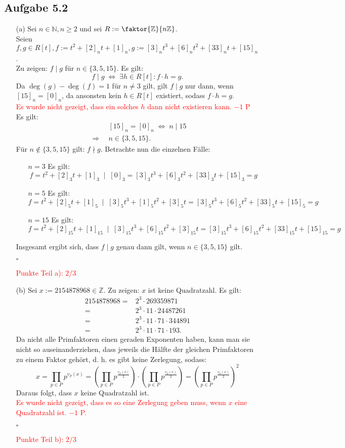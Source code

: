 \documentclass[12pt]{article}
\newcommand{\corr}[1]{\textcolor{red}{#1}}
\newcommand{\QED}{\begin{flushright} $\square$ \end{flushright}}
\newcommand{\df}{\enspace\Longrightarrow\enspace}
\newcommand{\gdw}{\;\Longleftrightarrow\;}
\begin{document}
\subsection*{Aufgabe 5.2}
\begin{enumerate}
	\item[(a)] Sei $n\in\mathbb{N},n\geq 2$ und sei $R:=\faktor{\mathbb{Z}}{n\mathbb{Z}}$. \\
	Seien $f,g\in R[t], f:=t^2+[2]_nt+[1]_n, g:=[3]_nt^3+[6]_nt^2+[33]_nt+[15]_n$. \\
	Zu zeigen: $f\mid g$ für $n\in\{3,5,15\}$. Es gilt:
	$$f\mid g \gdw \exists h\in R[t]:f\cdot h=g.$$
	Da $\deg(g)-\deg(f)=1$ für $n\neq 3$ gilt, gilt $f\mid g$ nur dann, wenn $[15]_n=[0]_n$, da ansonsten kein $h\in R[t]$ existiert, sodass $f\cdot h=g$.\\
\corr{Es wurde nicht gezeigt, dass ein solches $h$ dann nicht existieren kann. $-1$ P}\\
	 Es gilt:
	 \begin{align*}
	 	&[15]_n=[0]_n \gdw n\mid 15 \\
	 	\df &n\in\{3,5,15\}.
	 \end{align*}
	 Für $n\notin\{3,5,15\}$ gilt: $f\nmid g$.
	 Betrachte nun die einzelnen Fälle:
	 \begin{enumerate}
	 	\item[\underline{$n=3$}] Es gilt:
	 	$$f=t^2+[2]_3t+[1]_3 \;\mid\; [0]_3=[3]_3t^3+[6]_3t^2+[33]_3t+[15]_3=g$$
	 	
	 	\item[\underline{$n=5$}] Es gilt:
	 	$$f=t^2+[2]_5t+[1]_5 \;\mid\; [3]_5t^3+[1]_5t^2+[3]_5t=[3]_5t^3+[6]_5t^2+[33]_5t+[15]_5=g$$
	 	
	 	\item[\underline{$n=15$}] Es gilt:
	 	$$f=t^2+[2]_{15}t+[1]_{15} \;\mid\; [3]_{15}t^3+[6]_{15}t^2+[3]_{15}t=[3]_{15}t^3+[6]_{15}t^2+[33]_{15}t+[15]_{15}=g$$
	 \end{enumerate}
	 Insgesamt ergibt sich, dass $f\mid g$ genau dann gilt, wenn $n\in\{3,5,15\}$ gilt.
	 \QED
\corr{Punkte Teil a): $2/3$}
	
	\item[(b)] Sei $x:=2154878968\in\mathbb{Z}$. 
	Zu zeigen: $x$ ist keine Quadratzahl. Es gilt:
	\begin{align*}
		2154878968 =& 2^3\cdot 269359871 \\
		=& 2^3\cdot 11\cdot 24487261 \\
		=& 2^3\cdot 11\cdot 71\cdot 344891 \\
		=& 2^3\cdot 11\cdot 71\cdot 193.
	\end{align*}
	Da nicht alle Primfaktoren einen geraden Exponenten haben, kann man sie nicht so auseinanderziehen, dass jeweils die Hälfte der gleichen Primfaktoren zu einem Faktor gehört, d. h. es gibt keine Zerlegung, sodass:
	$$x=\prod_{p\in P}p^{\upsilon_p(x)}=\left(\prod_{p\in P}p^{\frac{\upsilon_p(x)}{2}}\right)\cdot\left(\prod_{p\in P}p^{\frac{\upsilon_p(x)}{2}}\right)=\left(\prod_{p\in P}p^{\frac{\upsilon_p(x)}{2}}\right)^2$$
	Daraus folgt, dass $x$ keine Quadratzahl ist.\\
\corr{Es wurde nicht gezeigt, dass es so eine Zerlegung geben muss, wenn $x$ eine Quadratzahl ist. $-1$ P.}
	\QED
\corr{Punkte Teil b): $2/3$}
\end{enumerate}
\end{document}
